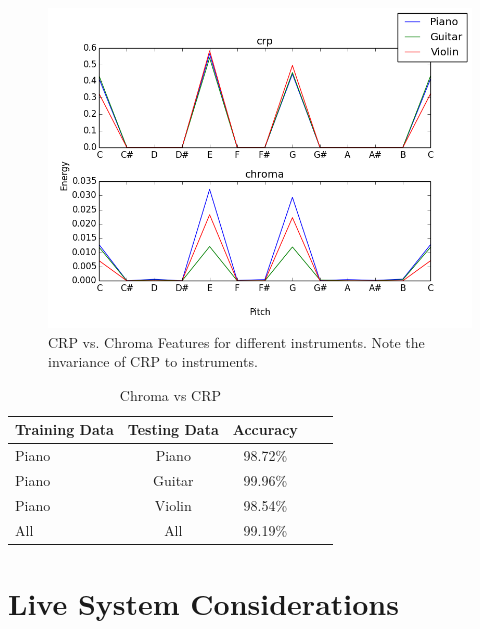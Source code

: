 \documentclass{article}
\begin{document}
\begin{figure}[ht]
\vskip 0.2in
\begin{center}
\centerline{\includegraphics[width=\columnwidth]{chromacrp}}
\caption{CRP vs. Chroma Features for different instruments. Note the invariance of CRP to instruments.}
\label{icml-historical}
\end{center}
\vskip -0.2in
\end{figure}

\begin{table}[t]
\caption{Chroma vs CRP}
\label{chromavscrp}
\vskip 0.15in
\begin{center}
\begin{small}
\begin{sc}
\begin{tabular}{lcccr}
\hline
\abovespace\belowspace
Training Data & Testing Data & Accuracy \\
\hline
\abovespace
Piano & Piano & 98.72\%\\
Piano & Guitar & 99.96\%\\
Piano & Violin & 98.54\%\\
All & All & 99.19\%\\
\hline
\end{tabular}
\end{sc}
\end{small}
\end{center}
\vskip -0.1in
\end{table}

\section{Live System Considerations}
\end{document}
